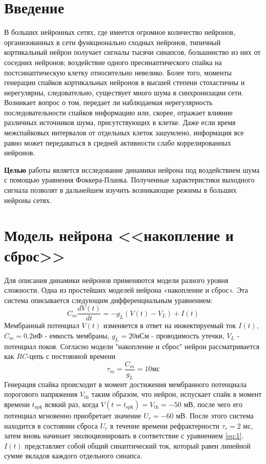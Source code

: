 


\newpage
\renewcommand{\phi}{\varphi}
\renewcommand{\div}{\text{div}}
\renewcommand{\grad}{\text{grad}}

\section*{Введение}
В больших нейронных сетях, где имеется огромное количество нейронов, организованных в сети функционально сходных нейронов, типичный кортикальный нейрон получает сигналы тысячи синапсов, большинство из них от соседних нейронов; воздействие одного пресинаптического спайка на постсинаптическую клетку относительно невелико. Более того, моменты генерации спайков кортикальных нейронов в высшей степени стохастичны и нерегулярны, следовательно, существует много шума в синхронизации сети. Возникает вопрос о том, передает ли наблюдаемая нерегулярность последовательности спайков информацию или, скорее, отражает влияние различных источников шума, присутствующих в клетке. Даже если время межспайковых интервалов от отдельных клеток зашумлено, информация все равно может передаваться в средней активности слабо коррелированных нейронов. 

\textbf{Целью} работы является исследование динамики нейрона под воздействием шума с помощью уравнения Фоккера-Планка. Полученные характеристики выходного сигнала позволят в дальнейшем изучить возникающие режимы в больших нейроны сетях.
\section{Модель нейрона <<накопление и сброс>>}
Для описания динамики нейронов применяются модели разного уровня сложности. Одна из простейших моделей нейрона «накопление и сброс». Эта система описывается следующим дифференциальным уравнением:
\begin{equation}
	C_m\frac{dV(t)}{dt}=-g_L(V(t)-V_L)+I(t)
	\label{eq:1}
\end{equation}
Мембранный потенциал $V(t)$ изменяется в
ответ на инжектируемый ток $I(t)$, $C_m=0.2 нФ$ - емкость мембраны, $g_L=20 нСм$ - проводимость утечки, $V_L$ - потенциал покоя. Согласно модели "накопление и сброс" нейрон рассматривается как $RC$-цепь с постоянной времени
\begin{equation}
	\tau_m=\frac{C_m}{g_L}=10 \text{мс}
	\label{eq:2} 
\end{equation}
Генерация спайка происходит в момент достижения мембранного потенциала порогового напряжения $V_\text{th}$ таким образом, что нейрон, испускает спайк в момент времени $t_\text{spk}$ всякий раз, когда 
$V(t=t_\text{spk})=V_\text{th} =-50 \text{ мВ}$, после чего его потенциал мгновенно приобретает значение $U_r=-60 \text{ мВ}$. После этого система находится в состоянии сброса $U_r$ в течение времени рефрактерности $\tau_r=2 \text{ мс}$, затем вновь начинает эволюционировать в соответствие с уравнением \eqref{eq:1}. $I(t)$ представляет собой общий синаптический ток, который равен линейной сумме вкладов каждого отдельного синапса.

